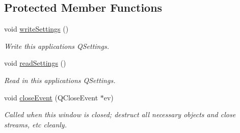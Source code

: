\subsection*{Protected Member Functions}
\begin{DoxyCompactItemize}
\item 
void \hyperlink{classLiveFitWindow_ab9da38cdc864bd7601ac769e162461e8}{write\+Settings} ()\hypertarget{classLiveFitWindow_ab9da38cdc864bd7601ac769e162461e8}{}\label{classLiveFitWindow_ab9da38cdc864bd7601ac769e162461e8}

\begin{DoxyCompactList}\small\item\em Write this application\textquotesingle{}s Q\+Settings. \end{DoxyCompactList}\item 
void \hyperlink{classLiveFitWindow_a7058672cfda9396b5ec8203c2777280b}{read\+Settings} ()\hypertarget{classLiveFitWindow_a7058672cfda9396b5ec8203c2777280b}{}\label{classLiveFitWindow_a7058672cfda9396b5ec8203c2777280b}

\begin{DoxyCompactList}\small\item\em Read in this application\textquotesingle{}s Q\+Settings. \end{DoxyCompactList}\item 
void \hyperlink{classLiveFitWindow_a0899373b045f23b4eafdbb303d91ff1a}{close\+Event} (Q\+Close\+Event $\ast$ev)\hypertarget{classLiveFitWindow_a0899373b045f23b4eafdbb303d91ff1a}{}\label{classLiveFitWindow_a0899373b045f23b4eafdbb303d91ff1a}

\begin{DoxyCompactList}\small\item\em Called when this window is closed; destruct all necessary objects and close streams, etc cleanly. \end{DoxyCompactList}\end{DoxyCompactItemize}
